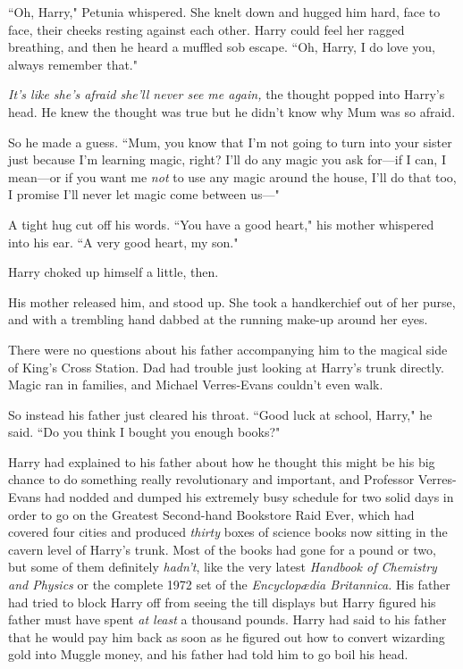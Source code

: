 ``Oh, Harry," Petunia whispered. She knelt down and hugged him hard, face to face, their cheeks resting against each other. Harry could feel her ragged breathing, and then he heard a muffled sob escape. ``Oh, Harry, I do love you, always remember that."

\emph{It's like she's afraid she'll never see me again,} the thought popped into Harry's head. He knew the thought was true but he didn't know why Mum was so afraid.

So he made a guess. ``Mum, you know that I'm not going to turn into your sister just because I'm learning magic, right? I'll do any magic you ask for—if I can, I mean—or if you want me \emph{not} to use any magic around the house, I'll do that too, I promise I'll never let magic come between us—"

A tight hug cut off his words. ``You have a good heart," his mother whispered into his ear. ``A very good heart, my son."

Harry choked up himself a little, then.

His mother released him, and stood up. She took a handkerchief out of her purse, and with a trembling hand dabbed at the running make-up around her eyes.

There were no questions about his father accompanying him to the magical side of King's Cross Station. Dad had trouble just looking at Harry's trunk directly. Magic ran in families, and Michael Verres-Evans couldn't even walk.

So instead his father just cleared his throat. ``Good luck at school, Harry," he said. ``Do you think I bought you enough books?"

Harry had explained to his father about how he thought this might be his big chance to do something really revolutionary and important, and Professor Verres-Evans had nodded and dumped his extremely busy schedule for two solid days in order to go on the Greatest Second-hand Bookstore Raid Ever, which had covered four cities and produced \emph{thirty} boxes of science books now sitting in the cavern level of Harry's trunk. Most of the books had gone for a pound or two, but some of them definitely \emph{hadn't}, like the very latest \emph{Handbook of Chemistry and Physics} or the complete 1972 set of the \emph{Encyclopædia Britannica.} His father had tried to block Harry off from seeing the till displays but Harry figured his father must have spent \emph{at least} a thousand pounds. Harry had said to his father that he would pay him back as soon as he figured out how to convert wizarding gold into Muggle money, and his father had told him to go boil his head.

